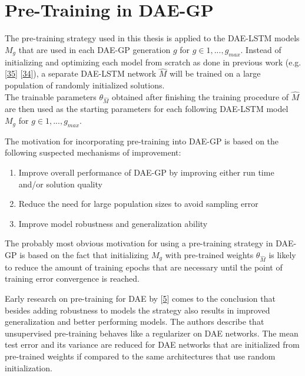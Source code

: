 \documentclass[
  11pt,
]{article}
\providecommand{\tightlist}{%
  \setlength{\itemsep}{0pt}\setlength{\parskip}{0pt}}
\begin{document}
\hypertarget{pre-training-in-dae-gp}{%
\section{Pre-Training in DAE-GP}\label{pre-training-in-dae-gp}}

The pre-training strategy used in this thesis is applied to the DAE-LSTM models \(M_g\) that are used in each DAE-GP generation \(g\) for \(g\in{1,...,g_{max}}\).
Instead of initializing and optimizing each model from scratch as done in previous work (e.g. {[}\protect\hyperlink{ref-dae-gp_2020_rtree}{35}{]} {[}\protect\hyperlink{ref-dae-gp_2022_symreg}{34}{]}), a separate DAE-LSTM network \(\hat{M}\) will be trained on a large population of randomly initialized solutions.\\

The trainable parameters \(\theta_{\hat{M}}\) obtained after finishing the training procedure of \(\hat{M}\) are then used as the starting parameters for each following DAE-LSTM model \(M_g\) for \(g\in{1,...,g_{max}}\).

The motivation for incorporating pre-training into DAE-GP is based on the following suspected mechanisms of improvement:

\begin{enumerate}
\def\labelenumi{\arabic{enumi}.}
\tightlist
\item
  Improve overall performance of DAE-GP by improving either run time and/or solution quality
\item
  Reduce the need for large population sizes to avoid sampling error
\item
  Improve model robustness and generalization ability
\end{enumerate}

The probably most obvious motivation for using a pre-training strategy in DAE-GP is based on the fact that initializing \(M_g\) with pre-trained weights \(\theta_{\hat{M}}\) is likely to reduce the amount of training epochs that are necessary until the point of training error convergence is reached.

Early research on pre-training for DAE by {[}\protect\hyperlink{ref-pmlr-v5-erhan09a}{5}{]} comes to the conclusion that besides adding robustness to models the strategy also results in improved generalization and better performing models.
The authors describe that unsupervised pre-training behaves like a regularizer on DAE networks.
The mean test error and its variance are reduced for DAE networks that are initialized from pre-trained weights if compared to the same architectures that use random initialization.
\end{document}
